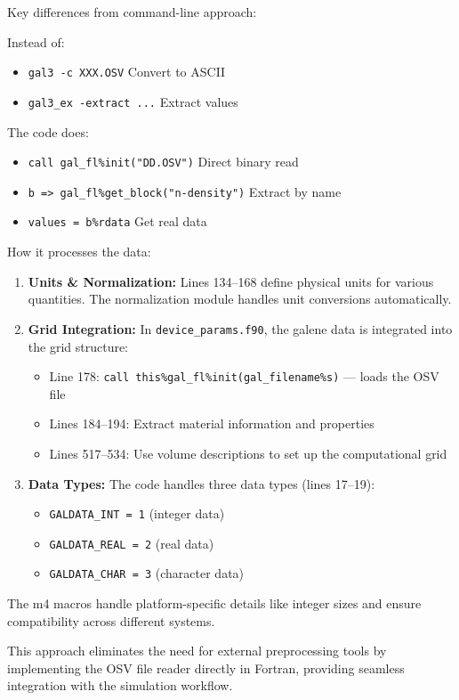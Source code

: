 Key differences from command-line approach:

Instead of:
\begin{itemize}
  \item \texttt{gal3 -c XXX.OSV} \hspace{1em} Convert to ASCII
  \item \texttt{gal3\_ex -extract ...} \hspace{1em} Extract values
\end{itemize}

The code does:
\begin{itemize}
  \item \texttt{call gal\_fl\%init("DD.OSV")} \hspace{1em} Direct binary read
  \item \texttt{b => gal\_fl\%get\_block("n-density")} \hspace{1em} Extract by name
  \item \texttt{values = b\%rdata} \hspace{1em} Get real data
\end{itemize}

How it processes the data:

\begin{enumerate}
  \item \textbf{Units \& Normalization:} Lines 134--168 define physical units 
    for various quantities. The normalization module handles unit conversions automatically.
  \item \textbf{Grid Integration:} In \texttt{device\_params.f90}, the galene data is integrated into the grid structure:
    \begin{itemize}
      \item Line 178: \texttt{call this\%gal\_fl\%init(gal\_filename\%s)} --- loads the OSV file
      \item Lines 184--194: Extract material information and properties
      \item Lines 517--534: Use volume descriptions to set up the computational grid
    \end{itemize}
  \item \textbf{Data Types:} The code handles three data types (lines 17--19):
    \begin{itemize}
      \item \texttt{GALDATA\_INT = 1} (integer data)
      \item \texttt{GALDATA\_REAL = 2} (real data)
      \item \texttt{GALDATA\_CHAR = 3} (character data)
    \end{itemize}
\end{enumerate}

The m4 macros handle platform-specific details like integer sizes and ensure compatibility across different systems.

This approach eliminates the need for external preprocessing tools by implementing the OSV file reader directly in Fortran, providing seamless integration with the simulation workflow.
